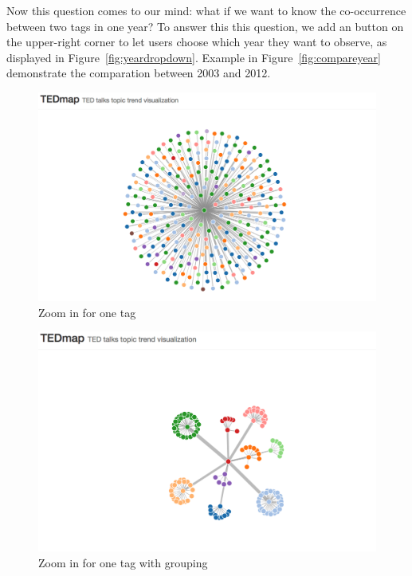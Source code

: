 \documentclass{report}
\numberwithin{figure}{section}
\begin{document}
\quad Now this question comes to our mind: what if we want to know the co-occurrence between two tags in one year? To answer this this question, we add an button on the upper-right corner to let users choose which year they want to observe, as displayed in Figure~\ref{fig:yeardropdown}. Example in Figure~\ref{fig:compareyear} demonstrate the comparation between 2003 and 2012.

\begin{figure}
\begin{center}
\includegraphics[scale=0.25]{focusOneTag_d1}
\caption{Zoom in for one tag}
\label{fig:zoomin1}
\end{center}
\end{figure}

\begin{figure}
\begin{center}
\includegraphics[scale=0.3]{focusOneTag_d2}
\caption{Zoom in for one tag with grouping}
\label{fig:zoomin2}
\end{center}
\end{figure}
\end{document}
